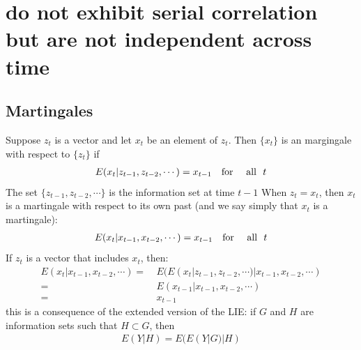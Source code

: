 \documentclass[a4paper,twoside,11pt]{article}
\begin{document}
\section{do not exhibit serial correlation but are not independent across time}
\subsection{Martingales}
Suppose $z_t$ is a vector and let $x_t$ be an element of $z_t$. Then $\{x_t \}$ is an margingale with respect to $\{z_t\}$ if
\begin{equation*}
\begin{aligned}
E(x_t | z_{t-1}, z_{t-2}, \cdots ) = x_{t-1} \ \ \ \textmd{for \ \ \ all \ } t 
\end{aligned}
\end{equation*}
The set $\{ z_{t-1},  z_{t-2}, \cdots \}$ is the information set at time $t-1$
\newline
When $z_t= x_t$,  then $x_t$ is a martingale with respect to its own past (and
we say simply that $x_t$ is a martingale):
\begin{equation*}
\begin{aligned}
E(x_t | x_{t-1}, x_{t-2}, \cdots ) = x_{t-1} \ \ \ \textmd{for \ \ \ all \ } t 
\end{aligned}
\end{equation*}
If $z_t$ is a vector that includes $x_t$, then: 
\begin{equation*}
\begin{aligned}
E(x_t | x_{t-1},x_{t-2}, \cdots ) =& \  E(E(x_t | z_{t-1}, z_{t-2}, \cdots )| x_{t-1}, x_{t-2},\cdots ) \\
=& \ E(x_{t-1} | x_{t-1}, x_{t-2}, \cdots ) \\
=& \ x_{t-1}
\end{aligned}
\end{equation*}
this is a consequence of the extended version of the LIE: if $G$ and $H$ are
information sets such that $H \subset G$, then
\begin{equation*}
\begin{aligned}
E(Y|H)= E(E(Y|G)|H)
\end{aligned}
\end{equation*}
\end{document}
